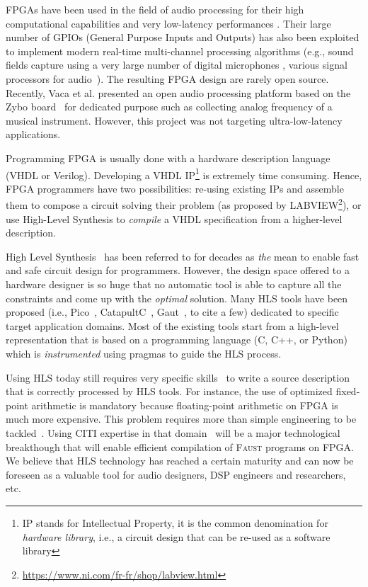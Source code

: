\documentclass[a4paper,9pt]{extarticle}
\newcommand{\F}{\textsc{Faust}}
\begin{document}
FPGAs have been used in the field of audio processing for their high computational capabilities \cite{Choi2013,Pfeifle2012,motuk2005implementation,motuk2007design} and very low-latency performances \cite{Verstraelen2014}. Their large number of GPIOs (General Purpose Inputs and Outputs) has also been exploited to implement modern real-time multi-channel processing algorithms (e.g., sound fields capture using a very large number of digital microphones \cite{salze2019new,wavefield}, various signal processors for audio~\cite{AudioMovie,zhang2015design}). The resulting FPGA design are rarely open source. Recently, Vaca et al. presented an open audio processing platform based on the Zybo board~\cite{zyboAudio} for dedicated purpose such as collecting analog frequency of a musical instrument. However, this project was not targeting ultra-low-latency applications.

Programming FPGA is usually done with a hardware description language (VHDL or Verilog). Developing a VHDL IP\footnote{IP stands for Intellectual Property, it is the common denomination for {\em hardware library}, i.e., a circuit design that can be re-used as a software library} is extremely time consuming. Hence, FPGA programmers have two possibilities: re-using existing IPs and assemble them to compose a circuit solving their problem (as proposed by LABVIEW\footnote{\url{https://www.ni.com/fr-fr/shop/labview.html}}), or use High-Level Synthesis to {\em compile} a VHDL specification from a higher-level description.

High Level Synthesis~\cite{HLS} has been referred to for decades as {\em the} mean to enable fast and safe circuit design for programmers. However, the design space offered to a hardware designer is so huge that no automatic tool is able to capture all the constraints and come up with the {\em optimal} solution. Many HLS tools have been proposed (i.e., Pico~\cite{pico}, CatapultC~\cite{catapultC}, Gaut~\cite{gaut}, to cite a few) dedicated to specific target application domains. Most of the existing tools start from a high-level representation that is based on a programming language (C, C++, or Python) which is {\em instrumented} using pragmas to guide the HLS process.

Using HLS today still requires very specific skills~\cite{HLSbook} to write a source description that is correctly processed by HLS tools. For instance, the use of optimized fixed-point arithmetic is mandatory because floating-point arithmetic on FPGA is much more expensive. This problem requires more than simple engineering to be tackled~\cite{volkova:hal-01561052, cairn, sentieysid}.  Using CITI expertise in that domain~\cite{flopoco} will be a major technological breakthough that will enable efficient compilation of \F{} programs on FPGA. We believe that HLS technology has reached a certain maturity and can now be foreseen as a valuable tool for audio designers, DSP engineers and researchers, etc.
\end{document}

